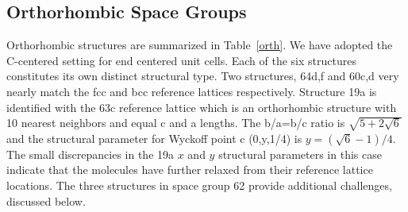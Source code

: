 \documentclass[preprint]{iucr}              %
\begin{document}
\subsection{Orthorhombic Space Groups}

Orthorhombic structures are summarized in Table~\ref{orth}. We have
adopted the C-centered setting for end centered unit cells. Each of
the six structures constitutes its own distinct structural type. Two
structures, 64d,f and 60c,d very nearly match the fcc and bcc
reference lattices respectively. Structure 19a is identified with
the 63c reference lattice which is an orthorhombic structure with 10
nearest neighbors and equal c and a lengths. The b/a=b/c ratio is
$\sqrt{5+2\sqrt{6}}$ and the structural parameter for Wyckoff point
c (0,y,1/4) is $y=(\sqrt{6}-1)/4$. The small discrepancies in the
19a $x$ and $y$ structural parameters in this case indicate that the
molecules have further relaxed from their reference lattice
locations.  The three structures in space group 62 provide
additional challenges, discussed below.
\end{document}
